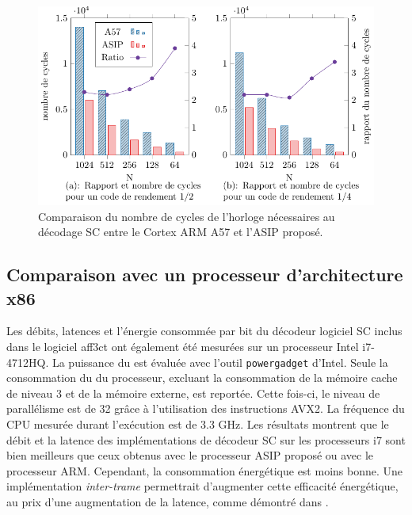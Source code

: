 \begin{figure}[htp]
\centering
\includegraphics{main/ch3_fig/curves/cycle_count/cycle_count}
\caption{Comparaison du nombre de cycles de l'horloge nécessaires au décodage SC entre le Cortex ARM A57 et l'ASIP proposé.}
\label{fig:cycle_count}
\end{figure}

\subsection{Comparaison avec un processeur d'architecture x86}
Les débits, latences et l'énergie consommée par bit du décodeur logiciel SC inclus dans le logiciel aff3ct ont également été mesurées sur un processeur Intel i7-4712HQ.
La puissance du \coeur est évaluée avec l'outil \texttt{powergadget} d'Intel. Seule la consommation du \coeur du processeur, excluant la consommation de la mémoire cache de niveau 3 et de la mémoire externe, est reportée. Cette fois-ci, le niveau de parallélisme est de 32 grâce à l'utilisation des instructions AVX2. La fréquence du CPU mesurée durant l'exécution est de 3.3 GHz. Les résultats montrent que le débit et la latence des implémentations de décodeur SC sur les processeurs i7 sont bien meilleurs que ceux obtenus avec le processeur ASIP proposé ou avec le processeur ARM. Cependant, la consommation énergétique est moins bonne. Une implémentation \textit{inter-trame} permettrait d'augmenter cette efficacité énergétique, au prix d'une augmentation de la latence, comme démontré dans \cite{cassagne_energy_2016}.


